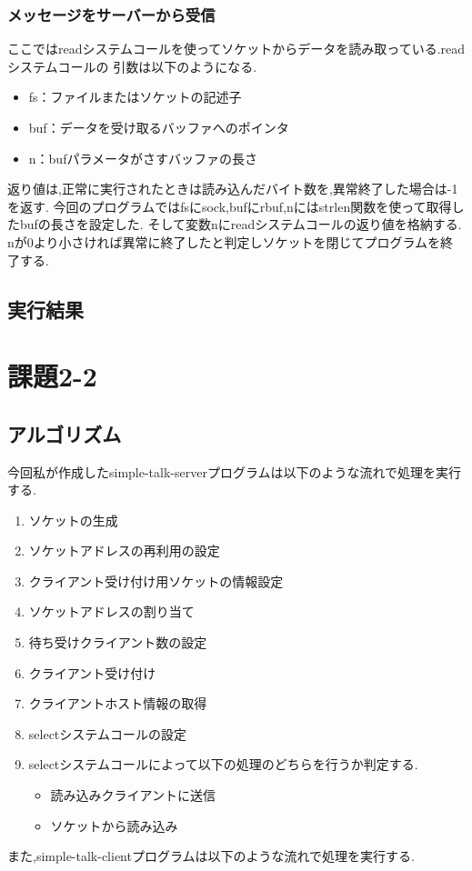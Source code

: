 \documentclass[dvipdfmx]{jarticle}
\begin{document}
\subsubsection{メッセージをサーバーから受信}
ここではreadシステムコールを使ってソケットからデータを読み取っている.readシステムコールの
引数は以下のようになる.\cite{13}
\begin{itemize}
    \item fs：ファイルまたはソケットの記述子
    \item buf：データを受け取るバッファへのポインタ
    \item n：bufパラメータがさすバッファの長さ
\end{itemize}
返り値は,正常に実行されたときは読み込んだバイト数を,異常終了した場合は-1を返す.\cite{14}
今回のプログラムではfsにsock,bufにrbuf,nにはstrlen関数を使って取得したbufの長さを設定した.
そして変数nにreadシステムコールの返り値を格納する.
nが0より小さければ異常に終了したと判定しソケットを閉じてプログラムを終了する.
\subsection{実行結果}

\section{課題2-2}
\subsection{アルゴリズム}
今回私が作成したsimple-talk-serverプログラムは以下のような流れで処理を実行する.
\begin{enumerate}
    \item ソケットの生成
    \item ソケットアドレスの再利用の設定
    \item クライアント受け付け用ソケットの情報設定
    \item ソケットアドレスの割り当て
    \item 待ち受けクライアント数の設定
    \item クライアント受け付け
    \item クライアントホスト情報の取得
    \item selectシステムコールの設定
    \item selectシステムコールによって以下の処理のどちらを行うか判定する.
    \begin{itemize}
        \item 読み込みクライアントに送信
        \item ソケットから読み込み
    \end{itemize}
\end{enumerate}
また,simple-talk-clientプログラムは以下のような流れで処理を実行する.
\end{document}
